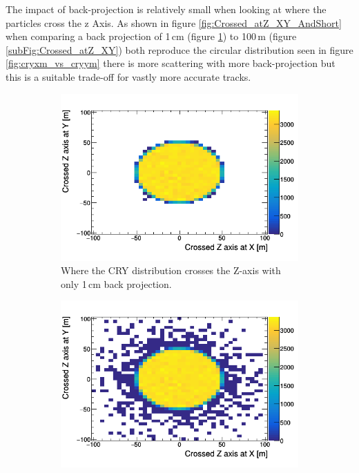 The impact of back-projection is relatively small when looking at where the particles cross the z Axis. As shown in figure \ref{fig:Crossed_atZ_XY_AndShort} when comparing a back projection of 1\,cm (figure \ref{subFig:CrossedZAxisShort}) to 100\,m (figure \ref{subFig:Crossed_atZ_XY}) both reproduce the circular distribution seen in figure \ref{fig:cryxm_vs_cryym} there is more scattering with more back-projection but this is a suitable trade-off for vastly more accurate tracks. 

\begin{figure}[!h]
\centering
\begin{subfigure}{.5\textwidth}
  \centering
  \includegraphics[width=\linewidth]{Chapter4/Figs/Raster/CryPlots/CrossedZAxisShort.png}
  \captionsetup{width=.9\linewidth}
  \caption{Where the CRY distribution crosses the Z-axis with only 1\,cm back projection.}
  \label{subFig:CrossedZAxisShort}
\end{subfigure}%
\begin{subfigure}{.5\textwidth}
  \centering
  \includegraphics[width=\linewidth]{Chapter4/Figs/Raster/CryPlots/Crossed_atZ_XY.png}

\end{subfigure}
\end{figure}
